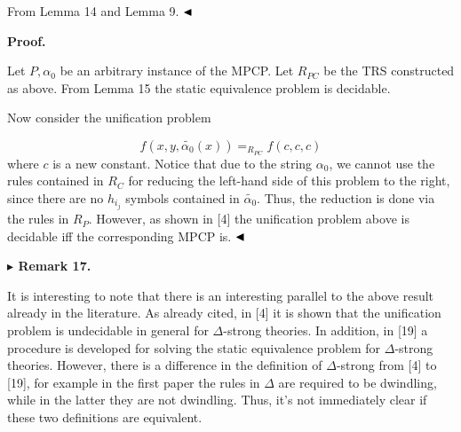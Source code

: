 \documentclass[10pt,a4paper]{amsart}
\begin{document}
 
From Lemma 14 and Lemma 9. $\hfill\blacktriangleleft$\par
 

 
 
\par\medskip\noindent\textbf{Proof.}\par
 
 
Let $P,\alpha_{0}$ be an arbitrary instance of the MPCP. Let $R_{PC}$ be the TRS constructed as above. From Lemma 15 the static equivalence problem is decidable.\par
 
 
 
Now consider the unification problem\par
    \[f(x,y,\widetilde{\alpha_{0}}(x))=_{R_{PC}}f(c,c,c)\]    
where $c$ is a new constant. Notice that due to the string $\alpha_{0}$, we cannot use the rules contained in $R_{C}$ for reducing the left-hand side of this problem to the right, since there are no $h_{i_{j}}$ symbols contained in $\widetilde{\alpha_{0}}$. Thus, the reduction is done via the rules in $R_{P}$. However, as shown in [4] the unification problem above is decidable iff the corresponding MPCP is. $\hfill\blacktriangleleft$\par
 
 
 
\par\medskip\noindent\textbf{$\blacktriangleright$ Remark 17.}\par
 
 
It is interesting to note that there is an interesting parallel to the above result already in the literature. As already cited, in [4] it is shown that the unification problem is undecidable in general for $\Delta$-strong theories. In addition, in [19] a procedure is developed for solving the static equivalence problem for $\Delta$-strong theories. However, there is a difference in the definition of $\Delta$-strong from [4] to [19], for example in the first paper the rules in $\Delta$ are required to be dwindling, while in the latter they are not dwindling. Thus, it’s not immediately clear if these two definitions are equivalent.\par
 
\end{document}
